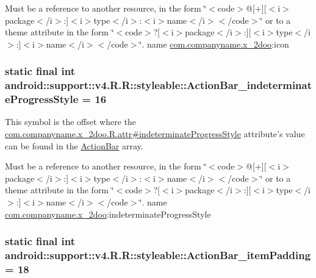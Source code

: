 Must be a reference to another resource, in the form \char`\"{}$<$code$>$@\mbox{[}+\mbox{]}\mbox{[}$<$i$>$package$<$/i$>$:\mbox{]}$<$i$>$type$<$/i$>$:$<$i$>$name$<$/i$>$$<$/code$>$\char`\"{} or to a theme attribute in the form \char`\"{}$<$code$>$?\mbox{[}$<$i$>$package$<$/i$>$:\mbox{]}\mbox{[}$<$i$>$type$<$/i$>$:\mbox{]}$<$i$>$name$<$/i$>$$<$/code$>$\char`\"{}.  name \hyperlink{namespacecom_1_1companyname_1_1x__2doo}{com.companyname.x\_\-2doo}:icon \hypertarget{classandroid_1_1support_1_1v4_1_1_r_1_1styleable_a8a88b78aad97f680e3cbee4dd08ef23}{
\subsubsection[{ActionBar\_\-indeterminateProgressStyle}]{\setlength{\rightskip}{0pt plus 5cm}static final int android::support::v4.R.R::styleable::ActionBar\_\-indeterminateProgressStyle = 16}}
\label{classandroid_1_1support_1_1v4_1_1_r_1_1styleable_a8a88b78aad97f680e3cbee4dd08ef23}


This symbol is the offset where the \hyperlink{classcom_1_1companyname_1_1x__2doo_1_1_r_1_1attr_5351683349dd0af98afbfef8154b47c4}{com.companyname.x\_\-2doo.R.attr\#indeterminateProgressStyle} attribute's value can be found in the \hyperlink{classandroid_1_1support_1_1v4_1_1_r_1_1styleable_5c6cf2c83551ebae05f365bb913fdddf}{ActionBar} array.

Must be a reference to another resource, in the form \char`\"{}$<$code$>$@\mbox{[}+\mbox{]}\mbox{[}$<$i$>$package$<$/i$>$:\mbox{]}$<$i$>$type$<$/i$>$:$<$i$>$name$<$/i$>$$<$/code$>$\char`\"{} or to a theme attribute in the form \char`\"{}$<$code$>$?\mbox{[}$<$i$>$package$<$/i$>$:\mbox{]}\mbox{[}$<$i$>$type$<$/i$>$:\mbox{]}$<$i$>$name$<$/i$>$$<$/code$>$\char`\"{}.  name \hyperlink{namespacecom_1_1companyname_1_1x__2doo}{com.companyname.x\_\-2doo}:indeterminateProgressStyle \hypertarget{classandroid_1_1support_1_1v4_1_1_r_1_1styleable_10e74e1d287a83eeaec631e4753a9d2f}{
\subsubsection[{ActionBar\_\-itemPadding}]{\setlength{\rightskip}{0pt plus 5cm}static final int android::support::v4.R.R::styleable::ActionBar\_\-itemPadding = 18}}
\label{classandroid_1_1support_1_1v4_1_1_r_1_1styleable_10e74e1d287a83eeaec631e4753a9d2f}


